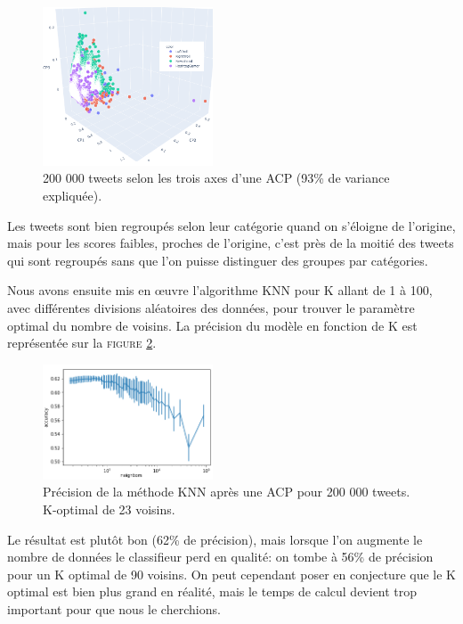 \documentclass[twocolumn,10pt]{article}
\begin{document}
\begin{figure}[h]
\begin{center}
\caption{\label{fig:ACP200000}200 000 tweets selon les trois axes d'une ACP (93\% de variance expliquée).}
\includegraphics[width=0.45\textwidth]{Ressources/200000ACP.png}
\end{center}
\end{figure}

Les tweets sont bien regroupés selon leur catégorie quand on s'éloigne de l'origine, mais pour les scores faibles, proches de l'origine, c'est près de la moitié des tweets qui sont regroupés sans que l'on puisse distinguer des groupes par catégories.

Nous avons ensuite mis en œuvre l'algorithme KNN pour K allant de 1 à 100, avec différentes divisions aléatoires des données, pour trouver le paramètre optimal du nombre de voisins. La précision du modèle en fonction de K est représentée sur la \textsc{figure} \ref{fig:KNNACP2}.

\begin{figure}[h]
\begin{center}
\caption{\label{fig:KNNACP2}Précision de la méthode KNN après une ACP pour 200 000 tweets. K-optimal de 23 voisins.}
\includegraphics[width=0.45\textwidth]{Ressources/KNNacp200000.png}
\end{center}
\end{figure}

Le résultat est plutôt bon (62\% de précision), mais lorsque l'on augmente le nombre de données le classifieur perd en qualité: on tombe à 56\% de précision pour un K optimal de 90 voisins. On peut cependant poser en conjecture que le K optimal est bien plus grand en réalité, mais le temps de calcul devient trop important pour que nous le cherchions.
\end{document}
